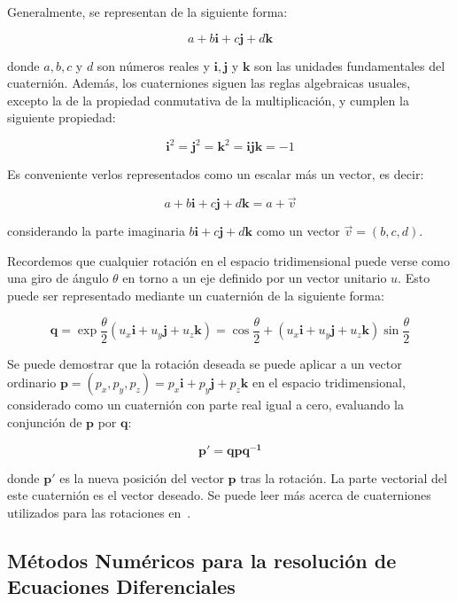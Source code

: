 Generalmente, se representan de la siguiente forma:

\[a + b\boldsymbol{i} + c\boldsymbol{j} + d\boldsymbol{k} \] 

donde $a,b,c$ y $d$ son números reales y $\boldsymbol{i}, \boldsymbol{j}$ y
$\boldsymbol{k}$ son las unidades fundamentales del cuaternión. Además, los
cuaterniones  siguen las reglas algebraicas usuales, excepto la de la propiedad
conmutativa de la multiplicación, y cumplen la siguiente propiedad:

\[\boldsymbol{i}^2 = \boldsymbol{j}^2 = \boldsymbol{k}^2 = \boldsymbol{ijk} = -1 \]

Es conveniente verlos representados como un escalar más un vector, es decir:

\[a + b\boldsymbol{i} + c\boldsymbol{j} + d\boldsymbol{k} = a +
\overrightarrow{v} \] 

considerando la parte imaginaria $b\boldsymbol{i} + c\boldsymbol{j} +
d\boldsymbol{k}$ como un vector $\overrightarrow{v} = (b,c,d)$. 

Recordemos que cualquier rotación en el espacio tridimensional puede verse como
una giro de ángulo $\theta$ en torno a un eje definido por un vector unitario
$u$. Esto puede ser representado mediante un cuaternión de la siguiente forma:

\[\boldsymbol{q} = \exp{\frac{\theta}{2}(u_x\boldsymbol{i} + u_y\boldsymbol{j} +
		u_z\boldsymbol{k})} = \cos{\frac{\theta}{2}} + (u_x\boldsymbol{i} + 
u_y\boldsymbol{j} + u_z\boldsymbol{k})\sin{\frac{\theta}{2}} \]

Se puede demostrar que la rotación deseada se puede aplicar a un vector
ordinario $\boldsymbol{p} = (p_x, p_y, p_z) = p_x\boldsymbol{i} +
p_y\boldsymbol{j} + p_z\boldsymbol{k}$ en el espacio tridimensional, considerado
como un cuaternión con parte real igual a cero, evaluando la conjunción de
$\boldsymbol{p}$ por $\boldsymbol{q}$:

\[ \boldsymbol{p'} = \boldsymbol{qpq^{-1}} \]

donde $\boldsymbol{p'}$ es la nueva posición del vector $\boldsymbol{p}$ tras la
rotación. La parte vectorial del este cuaternión es el vector deseado. Se puede
leer más acerca de cuaterniones utilizados para las rotaciones en~\citet{Vicci}.

\subsection{Métodos Numéricos para la resolución de Ecuaciones Diferenciales} 
\label{makereference5.4.3}

